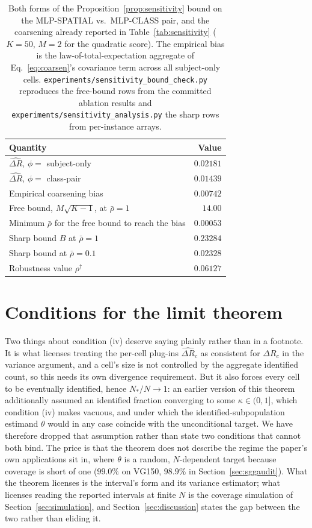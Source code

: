\begin{table}[t]
\centering
\caption{Both forms of the Proposition~\ref{prop:sensitivity} bound on the
MLP-SPATIAL vs.\ MLP-CLASS pair, and the coarsening already reported in
Table~\ref{tab:sensitivity} ($K=50$, $M=2$ for the quadratic score). The empirical bias
is the law-of-total-expectation aggregate of Eq.~\eqref{eq:coarsen}'s covariance
term across all subject-only cells.
\texttt{experiments/sensitivity\_bound\_check.py} reproduces the free-bound rows from the
committed ablation results and \texttt{experiments/sensitivity\_analysis.py} the sharp
rows from per-instance arrays.}
\label{tab:sensitivity-numeric}
\begin{tabular}{lr}
\toprule
Quantity & Value \\
\midrule
$\widehat{\Delta R}$, $\phi=$ subject-only & $0.02181$ \\
$\widehat{\Delta R}$, $\phi=$ class-pair & $0.01439$ \\
Empirical coarsening bias & $0.00742$ \\
\midrule
Free bound, $M\sqrt{K-1}$, at $\bar\rho=1$ & $14.00$ \\
Minimum $\bar\rho$ for the free bound to reach the bias & $0.00053$ \\
\midrule
Sharp bound $B$ at $\bar\rho=1$ & $0.23284$ \\
Sharp bound at $\bar\rho=0.1$ & $0.02328$ \\
Robustness value $\rho^\dagger$ & $0.06127$ \\
\bottomrule
\end{tabular}
\end{table}

\section{Conditions for the limit theorem}\label{app:clt}

Two things about condition (iv) deserve saying plainly rather than in a footnote. It is
what licenses treating the per-cell plug-ins $\widehat{\Delta R}_c$ as consistent for
$\Delta R_c$ in the variance argument, and a cell's size is not controlled by the
aggregate identified count, so this needs its own divergence requirement. But it also
forces every cell to be eventually identified, hence $N_*/N\to1$: an earlier version of
this theorem additionally assumed an identified fraction converging to some
$\kappa\in(0,1]$, which condition (iv) makes vacuous, and under which the
identified-subpopulation estimand $\theta$ would in any case coincide with the
unconditional target. We have therefore dropped that assumption rather than state two
conditions that cannot both bind. The price is that the theorem does not describe the
regime the paper's own applications sit in, where $\theta$ is a random, $N$-dependent
target because coverage is short of one ($99.0\%$ on VG150, $98.9\%$ in
Section~\ref{sec:sggaudit}). What the theorem licenses is the interval's form and its
variance estimator; what licenses reading the reported intervals at finite $N$ is the
coverage simulation of Section~\ref{sec:simulation}, and Section~\ref{sec:discussion}
states the gap between the two rather than eliding it.

